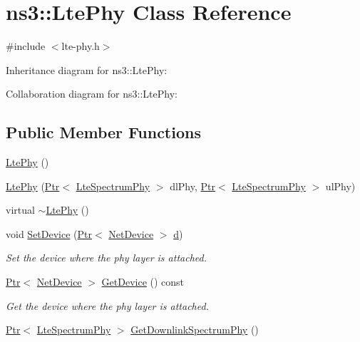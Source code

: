 \hypertarget{classns3_1_1LtePhy}{}\section{ns3\+:\+:Lte\+Phy Class Reference}
\label{classns3_1_1LtePhy}


{\ttfamily \#include $<$lte-\/phy.\+h$>$}



Inheritance diagram for ns3\+:\+:Lte\+Phy\+:


Collaboration diagram for ns3\+:\+:Lte\+Phy\+:
\subsection*{Public Member Functions}
\begin{DoxyCompactItemize}
\item 
\hyperlink{classns3_1_1LtePhy_a14ba34ce91bb83a5eebb4690e0c2cfbf}{Lte\+Phy} ()
\item 
\hyperlink{classns3_1_1LtePhy_a1bf07fd596069d0968c467ddd446cae4}{Lte\+Phy} (\hyperlink{classns3_1_1Ptr}{Ptr}$<$ \hyperlink{classns3_1_1LteSpectrumPhy}{Lte\+Spectrum\+Phy} $>$ dl\+Phy, \hyperlink{classns3_1_1Ptr}{Ptr}$<$ \hyperlink{classns3_1_1LteSpectrumPhy}{Lte\+Spectrum\+Phy} $>$ ul\+Phy)
\item 
virtual \hyperlink{classns3_1_1LtePhy_acdcad113ab08a5a900707b46ea3494db}{$\sim$\+Lte\+Phy} ()
\item 
void \hyperlink{classns3_1_1LtePhy_ac2b69646d27d07ab1345ed8104099f8e}{Set\+Device} (\hyperlink{classns3_1_1Ptr}{Ptr}$<$ \hyperlink{classns3_1_1NetDevice}{Net\+Device} $>$ \hyperlink{lte__pathloss_8m_a1aabac6d068eef6a7bad3fdf50a05cc8}{d})
\begin{DoxyCompactList}\small\item\em Set the device where the phy layer is attached. \end{DoxyCompactList}\item 
\hyperlink{classns3_1_1Ptr}{Ptr}$<$ \hyperlink{classns3_1_1NetDevice}{Net\+Device} $>$ \hyperlink{classns3_1_1LtePhy_a1fb7b7256bd510daa390b1365e10e2d5}{Get\+Device} () const 
\begin{DoxyCompactList}\small\item\em Get the device where the phy layer is attached. \end{DoxyCompactList}\item 
\hyperlink{classns3_1_1Ptr}{Ptr}$<$ \hyperlink{classns3_1_1LteSpectrumPhy}{Lte\+Spectrum\+Phy} $>$ \hyperlink{classns3_1_1LtePhy_a9560f8862545c7c5760e7f6737c5b938}{Get\+Downlink\+Spectrum\+Phy} ()

\end{DoxyCompactItemize}
